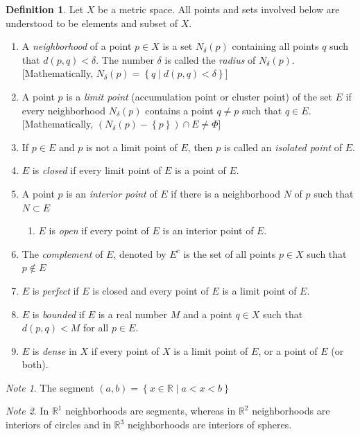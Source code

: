 \documentclass[12pt,oneside,a4paper]{book}
\newcommand{\R}{\mathds{R}}
\newcommand{\set}[1]{\left\{#1\right\}}
\theoremstyle{remark}
\newtheorem* {note}{Note}
\theoremstyle{definition}
\newtheorem{defn}{Definition}[section]
\begin{document}
\begin{defn}
    Let $ X $ be a metric space. All points and sets involved below are understood to be elements and subset of $ X $.
    \begin{enumerate}
        \item A \emph{neighborhood} of a point $ p\in X $ is a set $ N_\delta(p) $ containing all points $ q $ such that $ d(p,q)<\delta $. The number $ \delta $ is called the \emph{radius} of $ N_\delta(p) $. [Mathematically, $ N_\delta(p) =\set{q\mid d(p,q)<\delta}$]
        \item A point $ p $ is a \emph{limit point} (accumulation point or cluster point) of the set $ E $ if every neighborhood $ N_\delta(p) $ contains a point $ q\neq p $ such that $ q\in E $. [Mathematically, $ (N_\delta(p)-\set{p})\cap E\neq \Phi $]
        \item If $ p\in E $ and $ p $ is not a limit point of $ E $, then $ p $ is called an \emph{isolated point} of $ E $.
        \item $ E $ is \emph{closed} if every limit point of $ E $ is a point of $ E $.
        \item A point $ p $ is an \emph{interior point} of $ E $ if there is a neighborhood $ N $ of $ p $ such that $ N\subset E $
        \begin{enumerate}[label=(\roman*)]
            \item $ E $ is \emph{open} if every point of $ E $ is an interior point of $ E $.
        \end{enumerate}
        \item The \emph{complement} of $ E $, denoted by $ E^c $ is the set of all points $ p\in X $ such that $ p \notin E $
        \item $ E $ is \emph{perfect} if $ E $ is closed and every point of $ E $ is a limit point of $E $.
        \item $ E $ is \emph{bounded} if $ E $ is a real number $ M $ and a point $ q\in X $ such that $ d(p,q)<M $ for all $ p\in E $.
        \item $ E $ is \emph{dense} in $ X $ if every point of $ X $ is a limit point of $ E $, or a point of $ E $ (or both).
    \end{enumerate}
\end{defn}
\begin{note}
    The segment $ (a,b)=\set{x\in\R\mid a<x<b} $
\end{note}
\begin{note}
    In $ \R^1 $ neighborhoods are segments, whereas in $ \R^2 $ neighborhoods are interiors of circles and in $ \R^3 $ neighborhoods are interiors of spheres.
\end{note}
\end{document}
